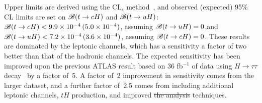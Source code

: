 \documentclass[PAPER, coverpage, atlasdraft=true, texlive=2016, UKenglish]{\ATLASLATEXPATH atlasdoc}
\providecommand{\DIFdel}[1]{{\protect\color{red}\sout{#1}}}                      %
\providecommand{\DIFdelbegin}{} %
\providecommand{\DIFdelend}{} %
\begin{document}
Upper limits are derived using the CL$_{\textrm{s}}$ method~\cite{Junk:1999kv,Read:2002hq}, and  
observed (expected) 95\% CL limits are set on $\mathscr{B}(t\to cH)$ and $\mathscr{B}(t\to uH)$:
$\mathscr{B}(t\to cH)<9.9 \times 10^{-4}\,(5.0 \times 10^{-4})$, assuming $\mathscr{B}(t\to uH)=0$,and $\mathscr{B}(t\to uH)<7.2 \times 10^{-4}\,(3.6 \times 10^{-4})$, assuming $\mathscr{B}(t\to cH)=0$.
These results are dominated by the leptonic channels, which has a sensitivity a factor of two better than that of the hadronic channels.
The expected sensitivity has been improved upon the previous ATLAS result based on 36 fb$^{-1}$ of data using $H\to \tau\tau$ decay~\cite{fcnc36} by a factor of~5. A factor of~2 improvement in sensitivity comes from the larger dataset, and a further factor of~2.5 comes from including
additional leptonic channels, $tH$ production, and improved \DIFdelbegin \DIFdel{the analysis }\DIFdelend techniques.
\end{document}
